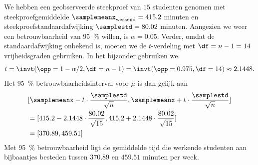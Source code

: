 \begin{enumerate}[label=(\alph*)]
{        We hebben een geobserveerde steekproef van $15$ studenten genomen met steekproefgemiddelde $\samplemeanx_{\text{werkend}} = 415.2$ minuten en steekproefstandaardafwijking $\samplestd = 80.02$ minuten.
        Aangezien we weer een betrouwbaarheid van \SI{95}{\percent} willen, is $\alpha = 0.05$.
        Verder, omdat de standaardafwijking onbekend is, moeten we de $t$-verdeling met $\df=n-1=14$ vrijheidsgraden gebruiken.
        In het bijzonder gebruiken we
        \[
            t = \invt(\opp=1-\alpha/2, \df=n-1) = \invt(\opp=0.975, \df=14) \approx 2.1448.
        \]
        Het \SI{95}{\percent}-betrouwbaarheidsinterval voor $\mu$ is dan gelijk aan 
        \begin{align*}
            &[\samplemeanx - t \cdot \frac{\samplestd}{\sqrt{n}}, \samplemeanx + t \cdot \frac{\samplestd}{\sqrt{n}}] \\
            &=[415.2 - 2.1448 \cdot \frac{80.02}{\sqrt{15}}, 415.2 + 2.1448 \cdot \frac{80.02}{\sqrt{15}}] \\
            &=[370.89, 459.51]
        \end{align*}
        Met \SI{95}{\percent} betrouwbaarheid ligt de gemiddelde tijd die werkende studenten aan bijbaantjes besteden tussen $370.89$ en $459.51$ minuten per week.
    }
\end{enumerate}

